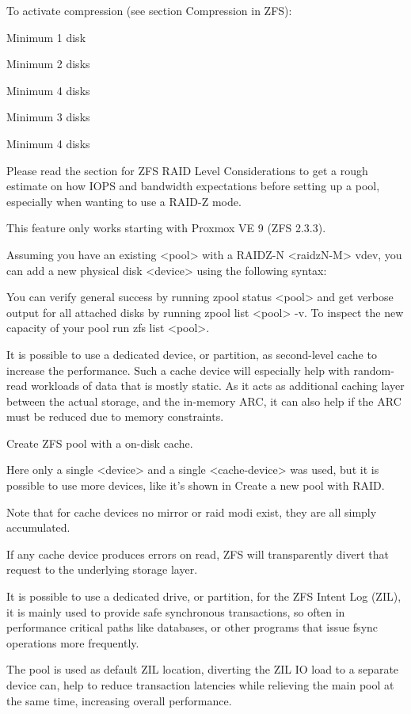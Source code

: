 To activate compression (see section Compression in ZFS):

Minimum 1 disk

Minimum 2 disks

Minimum 4 disks

Minimum 3 disks

Minimum 4 disks

Please read the section for ZFS RAID Level Considerations to get a rough estimate on how IOPS and bandwidth expectations before setting up a pool, especially when wanting to use a RAID-Z mode.

This feature only works starting with Proxmox VE 9 (ZFS 2.3.3).

Assuming you have an existing <pool> with a RAIDZ-N <raidzN-M> vdev, you can add a new physical disk <device> using the following syntax:

You can verify general success by running zpool status <pool> and get verbose output for all attached disks by running zpool list <pool> -v. To inspect the new capacity of your pool run zfs list <pool>.

It is possible to use a dedicated device, or partition, as second-level cache to increase the performance. Such a cache device will especially help with random-read workloads of data that is mostly static. As it acts as additional caching layer between the actual storage, and the in-memory ARC, it can also help if the ARC must be reduced due to memory constraints.

Create ZFS pool with a on-disk cache.

Here only a single <device> and a single <cache-device> was used, but it is possible to use more devices, like it’s shown in Create a new pool with RAID.

Note that for cache devices no mirror or raid modi exist, they are all simply accumulated.

If any cache device produces errors on read, ZFS will transparently divert that request to the underlying storage layer.

It is possible to use a dedicated drive, or partition, for the ZFS Intent Log (ZIL), it is mainly used to provide safe synchronous transactions, so often in performance critical paths like databases, or other programs that issue fsync operations more frequently.

The pool is used as default ZIL location, diverting the ZIL IO load to a separate device can, help to reduce transaction latencies while relieving the main pool at the same time, increasing overall performance.

